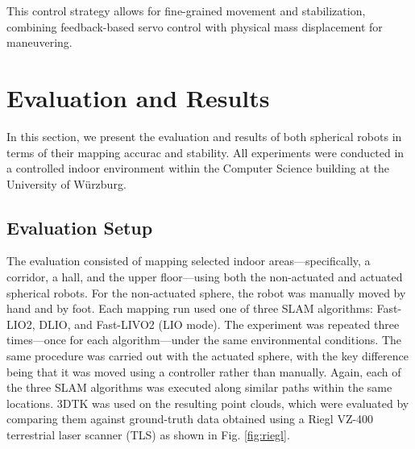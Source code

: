 \documentclass[conference]{IEEEtran}
\begin{document}


This control strategy allows for fine-grained movement and stabilization, combining feedback-based servo control with physical mass displacement for maneuvering.


\section{Evaluation and Results}
In this section, we present the evaluation and results of both spherical robots in terms of their mapping accurac and stability. All experiments were conducted in a controlled indoor environment within the Computer Science building at the University of Würzburg.


\subsection{Evaluation Setup}
The evaluation consisted of mapping selected indoor areas—specifically, a corridor, a hall, and the upper floor—using both the non-actuated and actuated spherical robots. For the non-actuated sphere, the robot was manually moved by hand and by foot. Each mapping run used one of three SLAM algorithms: Fast-LIO2, DLIO, and Fast-LIVO2 (LIO mode). The experiment was repeated three times—once for each algorithm—under the same environmental conditions. The same procedure was carried out with the actuated sphere, with the key difference being that it was moved using a controller rather than manually. Again, each of the three SLAM algorithms was executed along similar paths within the same locations. 3DTK was used on the resulting point clouds, which were evaluated by comparing them against ground-truth data obtained using a Riegl VZ-400 terrestrial laser scanner (TLS) as shown in Fig. \ref{fig:riegl}.
\end{document}
